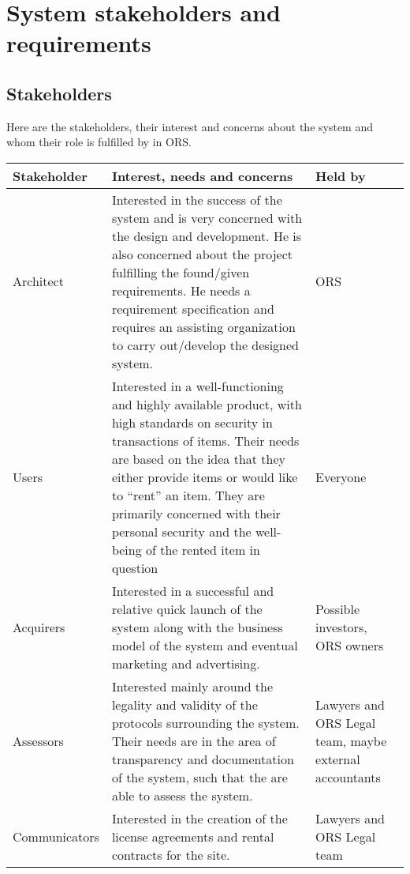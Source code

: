\chapter{System stakeholders and requirements}
\label{cha:syst-stak-requ}
\thispagestyle{fancy}

\section{Stakeholders}
\label{sec:stakeholders}
Here are the stakeholders, their interest and concerns about the system and whom their role is fulfilled by in ORS.
\begin{center}
    \begin{longtable}[H]{| l |  p{6cm} | p{2cm} |}
    \hline
    \textbf{Stakeholder} & \textbf{Interest, needs and concerns} & \textbf{Held
        by} \\
    \hline
    Architect & Interested in the success of the system and is very concerned
        with the design and development. He is also concerned about the project
        fulfilling the found/given requirements. He needs a requirement
        specification and requires an assisting organization to carry
        out/develop the designed system. & ORS \\
    \hline
    Users &  Interested in a well-functioning and highly available product,
        with high standards on security in transactions of items. Their needs
        are based on the idea that they either provide items or would like to
        ``rent'' an item. They are primarily concerned with their personal
        security and the well-being of the rented item in question & Everyone \\
    \hline
    Acquirers & Interested in a successful and relative quick launch of the 
        system along with the business model of the system and eventual 
        marketing and advertising. & Possible investors, ORS owners \\
    \hline
    Assessors & Interested mainly around the legality and validity of the
        protocols surrounding the system. Their needs are in the area of
        transparency and documentation of the system, such that the are able to
        assess the system. & Lawyers and ORS Legal team, maybe external
        accountants\\
    \hline
    Communicators & Interested in the creation of the license agreements and 
        rental contracts for the site. & Lawyers and ORS Legal team\\

\end{longtable}
\end{center}
